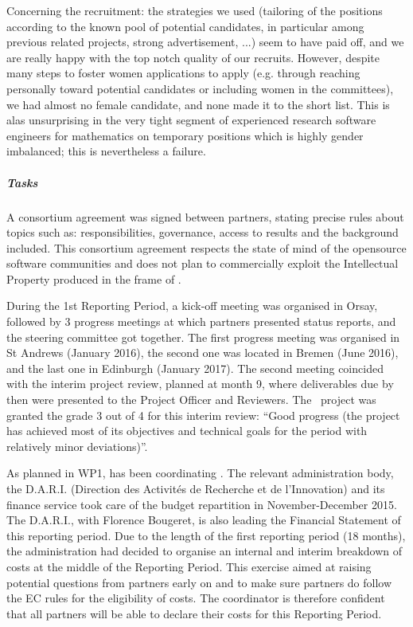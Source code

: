 Concerning the recruitment: the strategies we used (tailoring of the
positions according to the known pool of potential candidates, in
particular among previous related projects, strong advertisement, ...)
seem to have paid off, and we are really happy with the top notch
quality of our recruits. However, despite many steps to foster women
applications to apply (e.g. through reaching personally toward
potential candidates or including women in the committees), we had
almost no female candidate, and none made it to the short list. This
is alas unsurprising in the very tight segment of experienced research
software engineers for mathematics on temporary positions which is
highly gender imbalanced; this is nevertheless a failure.

\subparagraph{Tasks}

\subparagraph{}

A consortium agreement was signed
between partners, stating precise rules about topics such as:
responsibilities, governance, access to results and the background
included.  This consortium agreement respects the state of mind of the opensource software communities and does not plan to commercially exploit the Intellectual Property produced in the frame of \ODK.

During the 1st Reporting Period, a kick-off meeting was organised in Orsay, followed by
3 progress meetings at which partners presented status reports, and
the steering committee got together.  The first progress meeting was
organised in St Andrews (January 2016), the second one was located
in Bremen (June 2016), and the last one in Edinburgh (January 2017). The second meeting coincided with the interim project
review, planned at month 9, where deliverables due by then were
presented to the Project Officer and Reviewers. The \ODK\ project was
granted the grade 3 out of 4 for this interim review: ``Good progress
(the project has achieved most of its objectives and technical goals
for the period with relatively minor deviations)''.

As planned in WP1,  has been coordinating \ODK.  The  relevant administration body, the D.A.R.I. (Direction des Activités de Recherche et de l'Innovation) and its finance service took care of the budget repartition in November-December 2015. The D.A.R.I., with Florence Bougeret, is also leading the Financial Statement of this reporting period. Due to the length of the first reporting period (18 months), the  administration had decided to organise an internal and interim
breakdown of costs at the middle of the Reporting Period. This exercise aimed at raising potential questions
from partners early on and to make sure partners do follow the EC
rules for the eligibility of costs. The coordinator is therefore confident that all partners will be able to declare their costs for this Reporting Period.


